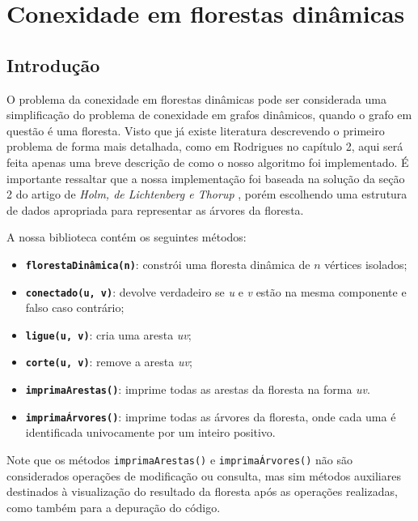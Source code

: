 
\chapter{Conexidade em florestas dinâmicas}

\section{Introdução}

O problema da conexidade em florestas dinâmicas pode ser considerada uma simplificação do problema de conexidade em grafos dinâmicos, quando o grafo em questão é uma floresta. Visto que já existe literatura descrevendo o primeiro problema de forma mais detalhada, como em Rodrigues \cite{arthur} no capítulo 2, aqui será feita apenas uma breve descrição de como o nosso algoritmo foi implementado. É importante ressaltar que a nossa implementação foi baseada na solução da seção 2 do artigo de \textit{Holm, de Lichtenberg e Thorup} \cite{jacob_holm}, porém escolhendo uma estrutura de dados apropriada para representar as árvores da floresta.

A nossa biblioteca contém os seguintes métodos:

\begin{itemize}
    \item \texttt{\textbf{florestaDinâmica(n)}}: constrói uma floresta dinâmica de $n$ vértices isolados;
    \item \texttt{\textbf{conectado(u, v)}}: devolve verdadeiro se \textit{u} e \textit{v} estão na mesma componente e falso caso contrário;
    \item \texttt{\textbf{ligue(u, v)}}: cria uma aresta \textit{uv};
    \item \texttt{\textbf{corte(u, v)}}: remove a aresta \textit{uv};
    \item \texttt{\textbf{imprimaArestas()}}: imprime todas as arestas da floresta na forma \textit{uv}.
    \item \texttt{\textbf{imprimaÁrvores()}}: imprime todas as árvores da floresta, onde cada uma é identificada univocamente por um inteiro positivo.
\end{itemize}

Note que os métodos \texttt{imprimaArestas()} e \texttt{imprimaÁrvores()} não são considerados operações de modificação ou consulta, mas sim métodos auxiliares destinados à visualização do resultado da floresta após as operações realizadas, como também para a depuração do código.  

